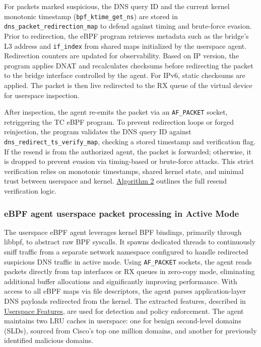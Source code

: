 \documentclass [11pt, proquest] {uwthesis}[2020/02/24]
\begin{document}
For packets marked suspicious, the DNS query ID and the current kernel monotonic timestamp (\texttt{bpf\_ktime\_get\_ns}) are stored in \texttt{dns\_packet\_redirection\_map} to defend against timing and brute-force evasion. Prior to redirection, the eBPF program retrieves metadata such as the bridge’s L3 address and \texttt{if\_index} from shared maps initialized by the userspace agent. Redirection counters are updated for observability. Based on IP version, the program applies DNAT and recalculates checksums before redirecting the packet to the bridge interface controlled by the agent. For IPv6, static checksums are applied. The packet is then live redirected to the RX queue of the virtual device for userspace inspection.

After inspection, the agent re-emits the packet via an \texttt{AF\_PACKET} socket, retriggering the TC eBPF program. To prevent redirection loops or forged reinjection, the program validates the DNS query ID against \texttt{dns\_redirect\_ts\_verify\_map}, checking a stored timestamp and verification flag. If the resend is from the authorized agent, the packet is forwarded; otherwise, it is dropped to prevent evasion via timing-based or brute-force attacks. This strict verification relies on monotonic timestamps, shared kernel state, and minimal trust between userspace and kernel. \hyperref[sec:alg2]{Algorithm 2} outlines the full resend verification logic.


\subsubsection{\textbf{eBPF agent userspace packet processing in Active Mode}}
\label{active:sec2}
The userspace eBPF agent leverages kernel BPF bindings, primarily through libbpf, to abstract raw BPF syscalls. It spawns dedicated threads to continuously sniff traffic from a separate network namespace configured to handle redirected suspicious DNS traffic in active mode. Using \texttt{AF\_PACKET} sockets, the agent reads packets directly from tap interfaces or RX queues in zero-copy mode, eliminating additional buffer allocations and significantly improving performance. With access to all eBPF maps via file descriptors, the agent parses application-layer DNS payloads redirected from the kernel. The extracted features, described in \hyperref[sec:feature-userspace]{Userspace Features}, are used for detection and policy enforcement. The agent maintains two LRU caches in userspace: one for benign second-level domains (SLDs), sourced from Cisco’s top one million domains, and another for previously identified malicious domains. 
\end{document}

